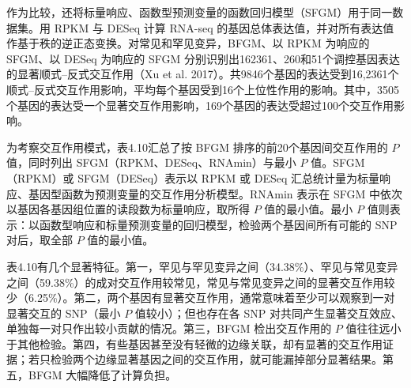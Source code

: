 作为比较，还将标量响应、函数型预测变量的函数回归模型（SFGM）用于同一数据集。用 RPKM 与 DESeq 计算 RNA-seq 的基因总体表达值，并对所有表达值作基于秩的逆正态变换。对常见和罕见变异，BFGM、以 RPKM 为响应的 SFGM、以 DESeq 为响应的 SFGM 分别识别出162361、260和51个调控基因表达的显著顺式–反式交互作用（Xu et al. 2017）。共9846个基因的表达受到16,2361个顺式–反式交互作用影响，平均每个基因受到16个上位性作用的影响。其中，3505个基因的表达受一个显著交互作用影响，169个基因的表达受超过100个交互作用影响。

为考察交互作用模式，表4.10汇总了按 BFGM 排序的前20个基因间交互作用的 $P$ 值，同时列出 SFGM（RPKM、DESeq、RNAmin）与最小 $P$ 值。SFGM（RPKM）或 SFGM（DESeq）表示以 RPKM 或 DESeq 汇总统计量为标量响应、基因型函数为预测变量的交互作用分析模型。RNAmin 表示在 SFGM 中依次以基因各基因组位置的读段数为标量响应，取所得 $P$ 值的最小值。最小 $P$ 值则表示：以函数型响应和标量预测变量的回归模型，检验两个基因间所有可能的 SNP 对后，取全部 $P$ 值的最小值。


表4.10有几个显著特征。第一，罕见与罕见变异之间（34.38\%）、罕见与常见变异之间（59.38\%）的成对交互作用较常见，常见与常见变异之间的显著交互作用较少（6.25\%）。第二，两个基因有显著交互作用，通常意味着至少可以观察到一对显著交互的 SNP（最小 $P$ 值较小）；但也存在各 SNP 对共同产生显著交互效应、单独每一对只作出较小贡献的情况。第三，BFGM 检出交互作用的 $P$ 值往往远小于其他检验。第四，有些基因甚至没有轻微的边缘关联，却有显著的交互作用证据；若只检验两个边缘显著基因之间的交互作用，就可能漏掉部分显著结果。第五，BFGM 大幅降低了计算负担。
\FloatBarrier
